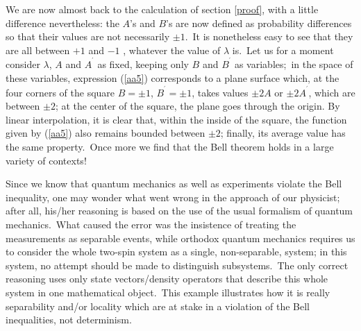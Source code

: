 \documentclass[12pt,onecolumn]{article}%
\begin{document}
We are now almost back to the calculation of section \ref{proof}, with a
little difference nevertheless: the $A$'s and $B$'s are now defined as
probability differences so that their values are not necessarily $\pm1$.\ It
is nonetheless easy to see that they are all between $+1$ and $-1$ , whatever
the value of $\lambda$ is.\ Let us for a moment consider $\lambda$, $A$ and
$A^{^{\prime}}$ as fixed, keeping only $B$ and $B^{^{\prime}}$ as
variables;\ in the space of these variables, expression (\ref{aa5})
corresponds to a plane surface which, at the four corners of the square
$B=\pm1$, $B^{^{\prime}}=\pm1$, takes values $\pm2A$ or $\pm2A^{^{\prime}}$,
which are between $\pm2$; at the center of the square, the plane goes through
the origin. By linear interpolation, it is clear that, within the inside of
the square, the function given by (\ref{aa5}) also remains bounded between
$\pm2$; finally, its average value has the same property.\ Once more we find
that the Bell theorem holds in a large variety of contexts!

Since we know that quantum mechanics as well as experiments violate the Bell
inequality, one may wonder what went wrong in the approach of our physicist;
after all, his/her reasoning is based on the use of the usual formalism of
quantum mechanics.\ What caused the error was the insistence of treating the
measurements as separable events, while orthodox quantum mechanics requires us
to consider the whole two-spin system as a single, non-separable, system; in
this system, no attempt should be made to distinguish subsystems.\ The only
correct reasoning uses only state vectors/density operators that describe this
whole system in one mathematical object.\ This example illustrates how it is
really separability and/or locality which are at stake in a violation of the
Bell inequalities, not determinism.
\end{document}

